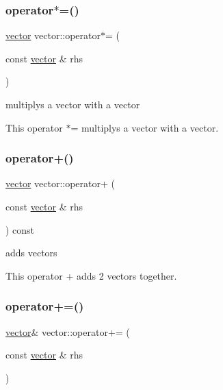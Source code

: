 \subsubsection{\texorpdfstring{operator$\ast$=()}{operator*=()}}
{\footnotesize\ttfamily \hyperlink{classvector}{vector} vector\+::operator$\ast$= (\begin{DoxyParamCaption}\item[{const \hyperlink{classvector}{vector} \&}]{rhs }\end{DoxyParamCaption})\hspace{0.3cm}{\ttfamily [inline]}}



multiplys a vector with a vector 

This operator $\ast$= multiplys a vector with a vector. \mbox{\label{classvector_a9d639bc53d77f17c6ba3af1dd9549424}} 
\subsubsection{\texorpdfstring{operator+()}{operator+()}}
{\footnotesize\ttfamily \hyperlink{classvector}{vector} vector\+::operator+ (\begin{DoxyParamCaption}\item[{const \hyperlink{classvector}{vector} \&}]{rhs }\end{DoxyParamCaption}) const\hspace{0.3cm}{\ttfamily [inline]}}



adds vectors 

This operator + adds 2 vectors together. \mbox{\label{classvector_acf4c6a4d343c92e211f80de7712a3cac}} 
\subsubsection{\texorpdfstring{operator+=()}{operator+=()}}
{\footnotesize\ttfamily \hyperlink{classvector}{vector}\& vector\+::operator+= (\begin{DoxyParamCaption}\item[{const \hyperlink{classvector}{vector} \&}]{rhs }\end{DoxyParamCaption})\hspace{0.3cm}{\ttfamily [inline]}}



